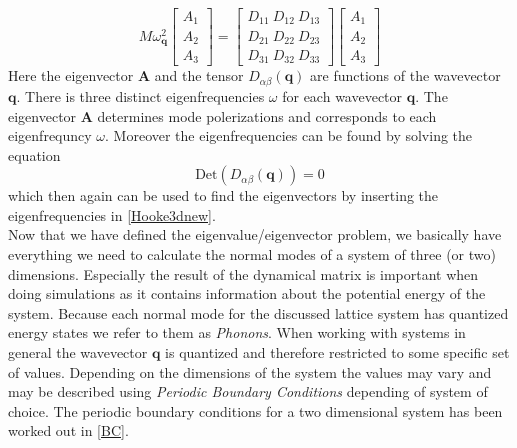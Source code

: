 \begin{equation}
    M\omega_{\mathbf{q}}^{2}
    \begin{bmatrix}
           A_{1} \\
           A_{2} \\
           A_{3}
         \end{bmatrix}=\begin{bmatrix}
           D_{11} \ D_{12} \ D_{13}\\
           D_{21} \ D_{22} \ D_{23}\\
           D_{31} \ D_{32} \ D_{33}
         \end{bmatrix}\begin{bmatrix}
           A_{1} \\
           A_{2} \\
           A_{3}
         \end{bmatrix}
\end{equation}
Here the eigenvector $\mathbf{A}$ and the tensor $D_{\alpha\beta}(\mathbf{q})$ are functions of the wavevector $\mathbf{q}$. There is three distinct eigenfrequencies $\omega$ for each wavevector $\mathbf{q}$. The eigenvector $\mathbf{A}$ determines mode polerizations and corresponds to each eigenfrequncy $\omega$. Moreover the eigenfrequencies can be found by solving the equation
\begin{equation}
    \text{Det}(D_{\alpha\beta}(\mathbf{q}))=0 
\end{equation}
which then again can be used to find the eigenvectors by inserting the eigenfrequencies in \cref{Hooke3dnew}. \\
Now that we have defined the eigenvalue/eigenvector problem, we basically have everything we need to calculate the normal modes of a system of three (or two) dimensions. Especially the result of the dynamical matrix is important when doing simulations as it contains information about the potential energy of the system. Because each normal mode for the discussed lattice system has quantized energy states we refer to them as \textit{Phonons}. When working with systems in general the wavevector $\mathbf{q}$ is quantized and therefore restricted to some specific set of values. Depending on the dimensions of the system the values may vary and may be described using \textit{Periodic Boundary Conditions} depending of system of choice. The periodic boundary conditions for a two dimensional system has been worked out in \cref{BC}. 
 
